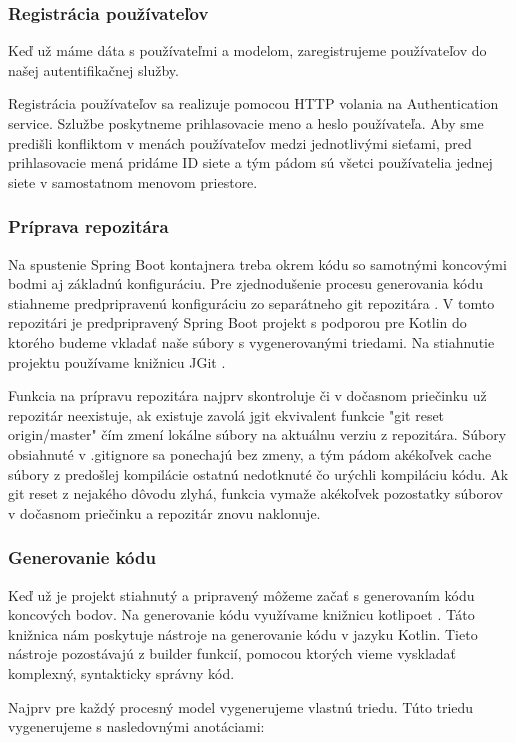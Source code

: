 \subsubsection{Registrácia používateľov}
Keď už máme dáta s používateľmi a modelom, zaregistrujeme používateľov do našej autentifikačnej služby.

Registrácia používateľov sa realizuje pomocou HTTP volania na Authentication service. Szlužbe poskytneme prihlasovacie meno a heslo používateľa. Aby sme predišli konfliktom v menách používateľov medzi jednotlivými sieťami, pred prihlasovacie mená pridáme ID siete a tým pádom sú všetci používatelia jednej siete v samostatnom menovom priestore.

\subsubsection{Príprava repozitára}
Na spustenie Spring Boot kontajnera treba okrem kódu so samotnými koncovými bodmi aj základnú konfiguráciu. Pre zjednodušenie procesu generovania kódu stiahneme predpripravenú konfiguráciu zo separátneho git repozitára \cite{dp_relay}. V tomto repozitári je predpripravený Spring Boot projekt s podporou pre Kotlin do ktorého budeme vkladať naše súbory s vygenerovanými triedami. Na stiahnutie projektu používame knižnicu JGit \cite{jgit}.

Funkcia na prípravu repozitára najprv skontroluje či v dočasnom priečinku už repozitár neexistuje, ak existuje zavolá jgit ekvivalent funkcie "git reset origin/master" čím zmení lokálne súbory na aktuálnu verziu z repozitára. Súbory obsiahnuté v .gitignore sa ponechajú bez zmeny, a tým pádom akékoľvek cache súbory z predošlej kompilácie ostatnú nedotknuté čo urýchli kompiláciu kódu. Ak git reset z nejakého dôvodu zlyhá, funkcia vymaže akékoľvek pozostatky súborov v dočasnom priečinku a repozitár znovu naklonuje.

\subsubsection{Generovanie kódu}
Keď už je projekt stiahnutý a pripravený môžeme začať s generovaním kódu koncových bodov. Na generovanie kódu  využívame knižnicu kotlipoet \cite{kotlipoet}. Táto knižnica nám poskytuje nástroje na generovanie kódu v jazyku Kotlin. Tieto nástroje pozostávajú z builder funkcií, pomocou ktorých vieme vyskladať komplexný, syntakticky správny kód.

Najprv pre každý procesný model vygenerujeme vlastnú triedu. Túto triedu vygenerujeme s nasledovnými anotáciami:

